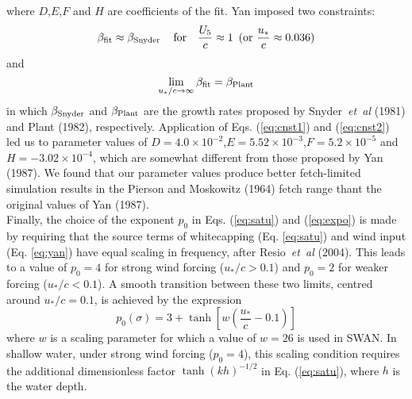 \documentclass[12pt]{book}
\begin{document}
where $D$,$E$,$F$ and $H$ are coefficients of the fit. Yan imposed two constraints:
\begin{equation}
  \beta_{\rm fit} \approx \beta_{\rm Snyder}\, \quad \mbox{for} \quad \frac{U_5}{c} \approx 1\,\,\, (\mbox{or} \,\, \frac{u_*}{c} \approx 0.036)
  \label{eq:cnst1}
\end{equation}
and
\begin{equation}
  \lim \limits_{u_*/c \rightarrow \infty} \beta_{\rm fit} = \beta_{\rm Plant}
  \label{eq:cnst2}
\end{equation}
in which $\beta_{\rm Snyder}$ and $\beta_{\rm Plant}$ are the growth rates proposed by Snyder~{\it et~al} (1981) and Plant (1982), respectively.
Application of Eqs. (\ref{eq:cnst1}) and (\ref{eq:cnst2}) led us to parameter values of $D=4.0 \times 10^{-2}$,$E=5.52 \times 10^{-3}$,$F=5.2 \times 10^{-5}$
and $H=-3.02 \times 10^{-4}$, which are somewhat different from those proposed by Yan (1987). We found that our parameter values produce better
fetch-limited simulation results in the Pierson and Moskowitz (1964) fetch range thant the original values of Yan (1987).
\\[2ex]
\noindent
Finally, the choice of the exponent $p_0$ in Eqs. (\ref{eq:satu}) and (\ref{eq:expo}) is made by requiring that the source terms of whitecapping
(Eq. \ref{eq:satu}) and wind input (Eq. \ref{eq:yan}) have equal scaling in frequency, after Resio~{\it et~al} (2004). This leads to a value of
$p_0 = 4$ for strong wind forcing ($u_*/c > 0.1$) and $p_0 = 2$ for weaker forcing ($u_*/c < 0.1$). A smooth transition between these two limits,
centred around $u_*/c = 0.1$, is achieved by the expression
\begin{equation}
  p_0(\sigma) = 3 + \tanh \left[ w \left( \frac{u_*}{c} - 0.1 \right) \right]
\end{equation}
where $w$ is a scaling parameter for which a value of $w = 26$ is used in SWAN. In shallow water, under strong wind forcing ($p_0=4$), this
scaling condition requires the additional dimensionless factor ${\tanh(kh)}^{-1/2}$ in Eq. (\ref{eq:satu}), where $h$ is the water depth.
\nocite{Res04LV}
\\[2ex]
\noindent
\end{document}
